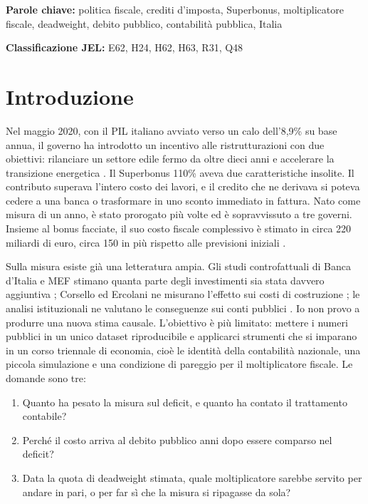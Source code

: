 \documentclass[11pt,a4paper]{article}
\begin{document}
\medskip
\textbf{Parole chiave:} politica fiscale, crediti d'imposta, Superbonus, moltiplicatore fiscale, deadweight, debito pubblico, contabilità pubblica, Italia

\textbf{Classificazione JEL:} E62, H24, H62, H63, R31, Q48

\section{Introduzione}
Nel maggio 2020, con il PIL italiano avviato verso un calo dell'8,9\% su base annua, il governo ha introdotto un incentivo alle ristrutturazioni con due obiettivi: rilanciare un settore edile fermo da oltre dieci anni e accelerare la transizione energetica \citep{capone2026}. Il Superbonus 110\% aveva due caratteristiche insolite. Il contributo superava l'intero costo dei lavori, e il credito che ne derivava si poteva cedere a una banca o trasformare in uno sconto immediato in fattura. Nato come misura di un anno, è stato prorogato più volte ed è sopravvissuto a tre governi. Insieme al bonus facciate, il suo costo fiscale complessivo è stimato in circa 220 miliardi di euro, circa 150 in più rispetto alle previsioni iniziali \citep{capone2026}.

Sulla misura esiste già una letteratura ampia. Gli studi controfattuali di Banca d'Italia e MEF stimano quanta parte degli investimenti sia stata davvero aggiuntiva \citep{accetturo2026,mef_wp}; Corsello ed Ercolani ne misurano l'effetto sui costi di costruzione \citep{corsello2024,corsello2025}; le analisi istituzionali ne valutano le conseguenze sui conti pubblici \citep{codogno2024,imf2024}. Io non provo a produrre una nuova stima causale. L'obiettivo è più limitato: mettere i numeri pubblici in un unico dataset riproducibile e applicarci strumenti che si imparano in un corso triennale di economia, cioè le identità della contabilità nazionale, una piccola simulazione e una condizione di pareggio per il moltiplicatore fiscale. Le domande sono tre:

\begin{enumerate}[leftmargin=1.5em,itemsep=2pt]
\item Quanto ha pesato la misura sul deficit, e quanto ha contato il trattamento contabile?
\item Perché il costo arriva al debito pubblico anni dopo essere comparso nel deficit?
\item Data la quota di deadweight stimata, quale moltiplicatore sarebbe servito per andare in pari, o per far sì che la misura si ripagasse da sola?
\end{enumerate}
\end{document}
